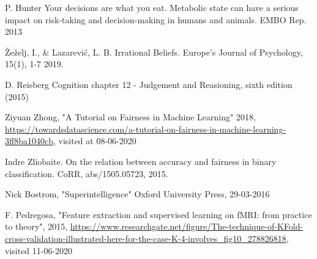 \documentclass[11pt, fleqn, titlepage]{article}
\begin{document}
\begin{thebibliography}{9}
		 P. Hunter Your decisions are what you eat. Metabolic state can have a serious impact on risk-taking and decision-making in humans and animals. EMBO Rep. 2013
		
		 Žeželj, I., \& Lazarević, L. B.  Irrational Beliefs. Europe’s Journal of Psychology, 15(1), 1-7 2019.
		
		 D. Reisberg Cognition chapter 12 - Judgement and Reasioning, sixth edition (2015)
		
		 Ziyuan Zhong, "A Tutorial on Fairness in Machine Learning" 2018, \url{https://towardsdatascience.com/a-tutorial-on-fairness-in-machine-learning-3ff8ba1040cb}, visited at 08-06-2020
		
		 Indre Zliobaite. On the relation between accuracy and fairness in binary classification. CoRR, abs/1505.05723, 2015.
		
		 Nick Bostrom, "Superintelligence" Oxford University Press, 29-03-2016
		
		 F. Pedregosa, "Feature extraction and supervised learning on fMRI: from practice to theory", 2015, \url{https://www.researchgate.net/figure/The-technique-of-KFold-cross-validation-illustrated-here-for-the-case-K-4-involves_fig10_278826818}, visited 11-06-2020
		
	\end{thebibliography}
	
	
	\newpage
	
	
\end{document}
